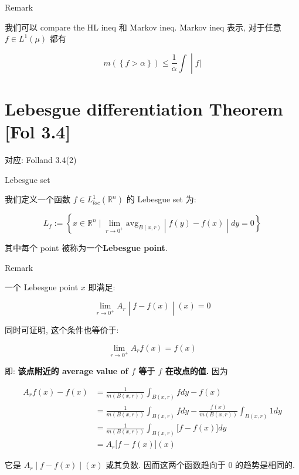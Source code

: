 \documentclass{qlnotes-export}
\begin{document}
\begin{qlremark}{Remark}

我们可以 compare the HL ineq 和 Markov ineq. Markov ineq 表示, 对于任意 \(f \in L^{1}(\mu)\) 都有

\[\left. m(\left\{ {f > \alpha} \right\}) \leq \frac{1}{\alpha}\int \middle| f| \right.\]

\end{qlremark}

\section{Lebesgue differentiation Theorem {[}Fol 3.4{]}}

对应: Folland 3.4(2)

\begin{definition}{Lebesgue set}\label{def-08-hardy-littlewood-ldt-lebesgue-set}

我们定义一个函数 \(f \in L_{loc}^{1}({\mathbb{R}}^{n})\) 的 Lebesgue set 为:

\[L_{f} := \left\{ x \in {\mathbb{R}}^{n} \mid \lim\limits_{r\rightarrow 0^{+}}\text{avg}_{B(x,r)} \middle| f(y) - f(x) \middle| dy = 0 \right\}\]

其中每个 point 被称为一个\textbf{Lebesgue point}.

\end{definition}

\begin{qlremark}{Remark}

一个 Lebesgue point \(x\) 即满足:

\[\left. \lim\limits_{r\rightarrow 0^{+}}A_{r} \middle| f - f(x) \middle| (x) = 0 \right.\]

同时可证明, 这个条件也等价于:

\[\lim\limits_{r\rightarrow 0^{+}}A_{r}f(x) = f(x)\]

即: \textbf{该点附近的 average value of \(f\) 等于 \(f\) 在改点的值.} 因为

\[\begin{matrix}
{A_{r}f(x) - f(x)} & {= \frac{1}{m(B(x,r))}\int_{B(x,r)}f dy - f(x)} \\
 & {= \frac{1}{m(B(x,r))}\int_{B(x,r)}f dy - \frac{f(x)}{m(B(x,r))}\int_{B(x,r)}1 dy} \\
 & {= \frac{1}{m(B(x,r))}\int_{B(x,r)}\lbrack f - f(x)\rbrack dy} \\
 & {= A_{r}\lbrack f - f(x)\rbrack(x)}
\end{matrix}\]

它是 \(\left. A_{r} \middle| f - f(x) \middle| (x) \right.\) 或其负数. 因而这两个函数趋向于 0 的趋势是相同的.

\end{qlremark}
\end{document}
